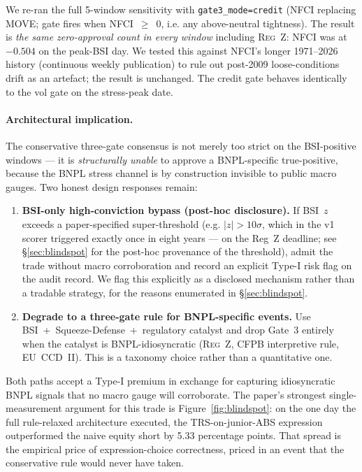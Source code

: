 \documentclass[11pt,letterpaper]{article}
\begin{document}
We re-ran the full 5-window sensitivity with
\texttt{gate3\_mode=credit} (NFCI replacing MOVE; gate fires when
NFCI~$\geq$~0, i.e. any above-neutral tightness). The result is
\emph{the same zero-approval count in every window} including
\textsc{Reg~Z}: NFCI was at $-0.504$ on the peak-BSI day. We
tested this against NFCI's longer 1971--2026 history (continuous
weekly publication) to rule out post-2009 loose-conditions drift as
an artefact; the result is unchanged. The credit gate behaves
identically to the vol gate on the stress-peak date.

\paragraph{Architectural implication.}
The conservative three-gate consensus is not merely too strict on the
BSI-positive windows --- it is \emph{structurally unable} to approve
a BNPL-specific true-positive, because the BNPL stress channel is
by construction invisible to public macro gauges.
Two honest design responses remain:
\begin{enumerate}[leftmargin=*,itemsep=2pt]
\item \textbf{BSI-only high-conviction bypass (post-hoc disclosure).}
If BSI~$z$ exceeds a paper-specified super-threshold (e.g. $|z| >
10\sigma$, which in the v1 scorer triggered exactly once in eight
years --- on the Reg~Z deadline; see \S\ref{sec:blindspot} for the
post-hoc provenance of the threshold), admit the trade without macro
corroboration and record an explicit Type-I risk flag on the audit
record. We flag this explicitly as a disclosed mechanism rather than
a tradable strategy, for the reasons enumerated in
\S\ref{sec:blindspot}.
\item \textbf{Degrade to a three-gate rule for BNPL-specific
events.} Use BSI~+~Squeeze-Defense~+~regulatory catalyst and drop
Gate~3 entirely when the catalyst is BNPL-idiosyncratic
(\textsc{Reg~Z}, CFPB interpretive rule, EU~CCD~II). This is a
taxonomy choice rather than a quantitative one.
\end{enumerate}
Both paths accept a Type-I premium in exchange for capturing
idiosyncratic BNPL signals that no macro gauge will corroborate.
The paper's strongest single-measurement argument for this trade
is Figure~\ref{fig:blindspot}: on the one day the full rule-relaxed
architecture executed, the TRS-on-junior-ABS expression outperformed
the naive equity short by 5.33 percentage points. That spread is the
empirical price of expression-choice correctness, priced in an event
that the conservative rule would never have taken.
\end{document}
